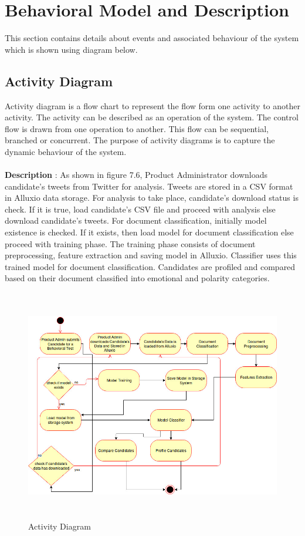 \documentclass[oneside,a4paper,12pt]{pictreport}
\begin{document}
\section{Behavioral Model and Description}
This section contains details about events and associated behaviour of the system which is shown using diagram below.

\subsection{Activity Diagram}
Activity diagram is a flow chart to represent the flow form one activity to another activity. The activity can be described as an operation of the system. The control flow is drawn from one operation to another. This flow can be sequential, branched or concurrent. The purpose of activity diagrams is to capture the dynamic behaviour of the system.\\\\
\textbf{Description} : As shown in figure 7.6, Product Administrator downloads candidate's tweets from Twitter for analysis. Tweets are stored in a CSV format in Alluxio data storage. For analysis to take place, candidate's download status is check. If it is true, load candidate's CSV file and proceed with analysis else download candidate's tweets. For document classification, initially model existence is checked. If it exists, then load model for document classification else proceed with training phase. The training phase consists of document preprocessing, feature extraction and saving model in Alluxio. Classifier uses this trained model for document classification. Candidates are profiled and compared based on their document classified into emotional and polarity categories.
\begin{figure}[h!]
\includegraphics[width=5.0in,height=4.0in]{Activity.jpg}
\caption{Activity Diagram}
\end{figure}
\newpage
\end{document}
